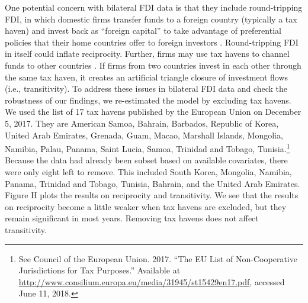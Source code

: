 \documentclass[reqno,onecolumn,letterpaper,12pt]{article}
\begin{document}
{One potential concern with bilateral FDI data is that they include round-tripping FDI, in which domestic firms transfer funds to a foreign country (typically a tax haven) and invest back as ``foreign capital'' to take advantage of preferential policies that their home countries offer to foreign investors \citep{Borga:2016}. Round-tripping FDI in itself could inflate reciprocity. Further, firms may use tax havens to channel funds to other countries \citep{Borga:2017}. If firms from two countries invest in each other through the same tax haven, it creates an artificial triangle closure of investment flows (i.e., transitivity). To address these issues in bilateral FDI data and check the robustness of our findings, we re-estimated the model by excluding tax havens. We used the list of 17 tax havens published by the European Union on December 5, 2017. They are American Samoa, Bahrain, Barbados, Republic of Korea, United Arab Emirates, Grenada, Guam, Macao, Marshall Islands, Mongolia, Namibia, Palau, Panama, Saint Lucia, Samoa, Trinidad and Tobago, Tunisia.\footnote{See Council of the European Union. 2017. ``The EU List of Non-Cooperative Jurisdictions for Tax Purposes.'' Available at \url{http://www.consilium.europa.eu/media/31945/st15429en17.pdf}, accessed June 11, 2018.}
Because the data had already been subset based on available covariates, there were only eight left to remove. This included South Korea, Mongolia, Namibia, Panama, Trinidad and Tobago, Tunisia, Bahrain, and the United Arab Emirates. Figure H plots the results on reciprocity and transitivity. We see that the results on reciprocity become a little weaker when tax havens are excluded, but they remain significant in most years. Removing tax havens does not affect transitivity.

}
\end{document}
